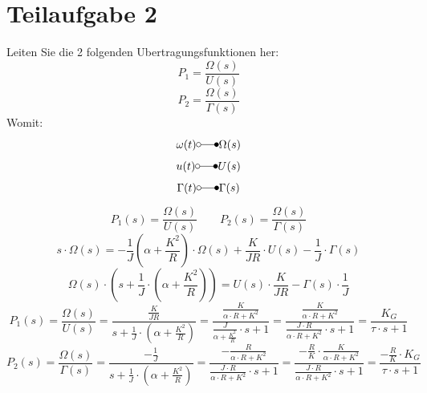 \section{Teilaufgabe 2}
\begin{aufgabe}
    Leiten Sie die 2 folgenden Ubertragungsfunktionen her:
    \[ P_1 = \frac{\Omega(s)}{U(s)} \]
    \[ P_2 = \frac{\Omega(s)}{\Gamma(s)} \]
    Womit: 
    \[ \omega(t) \laplace \Omega(s) \]
    \[ u(t) \laplace U(s) \]
    \[ \Gamma(t) \laplace \Gamma(s) \]
\end{aufgabe}
\[ P_1(s) = \frac{\Omega(s)}{U(s)} \qquad P_2(s) = \frac{\Omega(s)}{\Gamma(s)} \]
\[ s \cdot \Omega(s) 
    = -\frac{1}{J} \left(\alpha + \frac{K^2}{R}\right) \cdot \Omega(s)
    + \frac{K}{JR} \cdot U(s) 
    - \frac{1}{J} \cdot \Gamma(s)
\]
\[ \Omega(s) \cdot \left(s + \frac{1}{J} \cdot \left(\alpha + \frac{K^2}{R}\right)\right) 
    = U(s) \cdot \frac{K}{JR} 
    - \Gamma(s) \cdot \frac{1}{J}
\]
\[ P_1(s) = \frac{\Omega(s)}{U(s)} 
    = \frac{\frac{K}{JR}}{s + \frac{1}{J} \cdot \left(\alpha + \frac{K^2}{R}\right)}
    = \frac{\frac{K}{\alpha \cdot R + K^2}}{\frac{J}{\alpha + \frac{K^2}{R}} \cdot s + 1}
    = \frac{\frac{K}{\alpha \cdot R + K^2}}{\frac{J \cdot R}{\alpha \cdot R + K^2} \cdot s + 1}
    = \frac{K_G}{\tau \cdot s + 1}
\]
\[ P_2(s) = \frac{\Omega(s)}{\Gamma(s)}
    = \frac{-\frac{1}{J}}{s + \frac{1}{J} \cdot \left(\alpha + \frac{K^2}{R}\right)}
    = \frac{-\frac{R}{\alpha \cdot R + K^2}}{\frac{J \cdot R}{\alpha \cdot R + K^2} \cdot s + 1}
    = \frac{-\frac{R}{K} \cdot \frac{K}{\alpha \cdot R + K^2}}{\frac{J \cdot R}{\alpha \cdot R + K^2} \cdot s + 1}
    = \frac{-\frac{R}{K} \cdot K_G}{\tau \cdot s + 1}
\]
